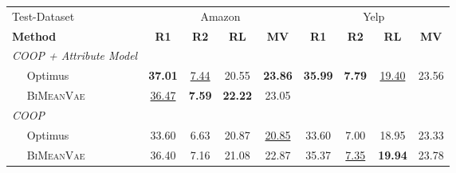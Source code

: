 \begin{table}[!h]
    \label{eval_results}
    \centering
    \begin{tabular}{@{}lcccccccc@{}}
    \toprule
             Test-Dataset                  & \multicolumn{4}{c}{Amazon} & \multicolumn{4}{c}{Yelp} \\ 
    \textbf{Method} & \textbf{R1} & \textbf{R2} & \textbf{RL} & \textbf{MV} & \textbf{R1} & \textbf{R2} & \textbf{RL} & \textbf{MV}\\ \midrule
    
    \textit{COOP + Attribute Model}        &         &         &        &        &        &   & &     \\
    $\quad$ Optimus            &     \textbf{37.01}    &   \underline{7.44}  &  20.55  & \textbf{23.86} &   \textbf{35.99}   &   \textbf{7.79}       & \underline{19.40}   &   23.56 \\ 
    $\quad$ \textsc{BiMeanVae}   &   \underline{36.47}   &   \textbf{7.59}    &   \textbf{22.22}  & 23.05 &     &      &   &    \\ \midrule
    

    \textit{COOP}              &         &         &        &        &        & &   &    \\
    $\quad$ Optimus           & 33.60  & 6.63    & 20.87 & \underline{20.85} & 33.60  & 7.00   & 18.95 & 23.33\\ 
    $\quad$ \textsc{BiMeanVae}  & 36.40 &  7.16 &  21.08 & 22.87 & 35.37  & \underline{7.35}  & \textbf{19.94} & 23.78\\ \midrule
    
    


\end{tabular}
\end{table}

